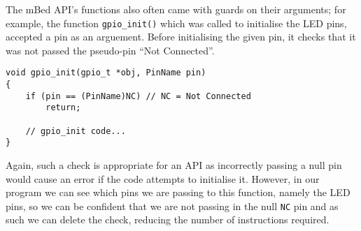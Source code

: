 The mBed API's functions also often came with guards on their arguments; for example, the function \verb|gpio_init()| which was called to initialise the LED pins, accepted a pin as an arguement. Before initialising the given pin, it checks that it was not passed the pseudo-pin ``Not Connected''.

\begin{lstlisting}
void gpio_init(gpio_t *obj, PinName pin)
{
    if (pin == (PinName)NC) // NC = Not Connected
        return;

    // gpio_init code...
}
\end{lstlisting}

Again, such a check is appropriate for an API as incorrectly passing a null pin would cause an error if the code attempts to initialise it. However, in our program we can see which pins we are passing to this function, namely the LED pins, so we can be confident that we are not passing in the null \verb|NC| pin and as such we can delete the check, reducing the number of instructions required.
